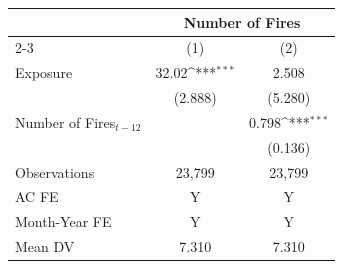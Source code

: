 {
\def\sym#1{\ifmmode^{#1}\else\(^{#1}\)\fi}
\begin{tabular}{l*{2}{c}}
\toprule
            &\multicolumn{2}{c}{Number of Fires}        \\\cmidrule(lr){2-3}
            &\multicolumn{1}{c}{(1)}         &\multicolumn{1}{c}{(2)}         \\
\midrule
Exposure    &       32.02\sym{***}&       2.508         \\
            &     (2.888)         &     (5.280)         \\
Number of Fires$_{t-12}$&                     &       0.798\sym{***}\\
            &                     &     (0.136)         \\
\midrule
Observations&      23,799         &      23,799         \\
AC FE       &           Y         &           Y         \\
Month-Year FE&           Y         &           Y         \\
Mean DV     &       7.310         &       7.310         \\
\bottomrule
\end{tabular}
}
